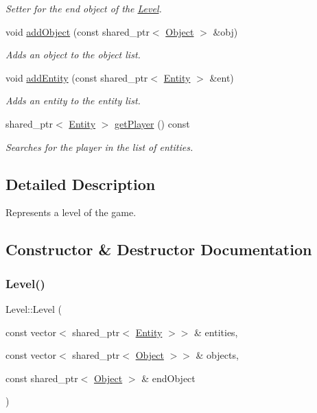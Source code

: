 \begin{DoxyCompactItemize}
\begin{DoxyCompactList}\small\item\em Setter for the end object of the \hyperlink{classLevel}{Level}. \end{DoxyCompactList}\item 
void \hyperlink{classLevel_a3effcc660e97c964a7782231f20fa6d3}{add\+Object} (const shared\+\_\+ptr$<$ \hyperlink{classObject}{Object} $>$ \&obj)
\begin{DoxyCompactList}\small\item\em Adds an object to the object list. \end{DoxyCompactList}\item 
void \hyperlink{classLevel_a481a39fdf7392703fc4e3c5715ddfa55}{add\+Entity} (const shared\+\_\+ptr$<$ \hyperlink{classEntity}{Entity} $>$ \&ent)
\begin{DoxyCompactList}\small\item\em Adds an entity to the entity list. \end{DoxyCompactList}\item 
shared\+\_\+ptr$<$ \hyperlink{classEntity}{Entity} $>$ \hyperlink{classLevel_ad8047f23492bae60e0b7305e7efff0c1}{get\+Player} () const
\begin{DoxyCompactList}\small\item\em Searches for the player in the list of entities. \end{DoxyCompactList}\end{DoxyCompactItemize}


\subsection{Detailed Description}
Represents a level of the game. 

\subsection{Constructor \& Destructor Documentation}
\mbox{\label{classLevel_a0bf031e33189b15e8ba66d8879fe3f34}} 
\subsubsection{\texorpdfstring{Level()}{Level()}\hspace{0.1cm}{\footnotesize\ttfamily [1/3]}}
{\footnotesize\ttfamily Level\+::\+Level (\begin{DoxyParamCaption}\item[{const vector$<$ shared\+\_\+ptr$<$ \hyperlink{classEntity}{Entity} $>$$>$ \&}]{entities,  }\item[{const vector$<$ shared\+\_\+ptr$<$ \hyperlink{classObject}{Object} $>$$>$ \&}]{objects,  }\item[{const shared\+\_\+ptr$<$ \hyperlink{classObject}{Object} $>$ \&}]{end\+Object }\end{DoxyParamCaption})}



